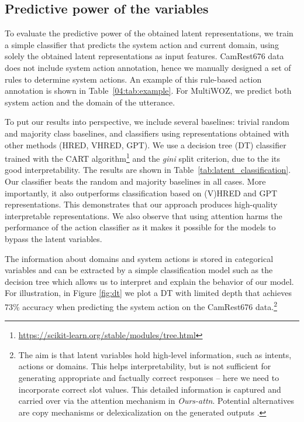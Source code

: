 \subsection{Predictive power of the variables}
\label{sec:pred_latents}
To evaluate the predictive power of the obtained latent representations, we train a simple classifier that predicts the system action and current domain, using solely the obtained latent representations as input features.
CamRest676 data does not include system action annotation, hence we manually designed a set of rules to determine system actions.
An example of this rule-based action annotation is shown in Table~\ref{04:tab:example}.
For MultiWOZ, we predict both system action and the domain of the utterance.

To put our results into perspective, we include several baselines: trivial random and majority class baselines, and classifiers using representations obtained with other methods (HRED, VHRED, GPT).
We use a decision tree (DT) classifier trained with the CART algorithm\footnote{\url{https://scikit-learn.org/stable/modules/tree.html}} and the \emph{gini} split criterion, due to the its good interpretability.
The results are shown in Table~\ref{tab:latent_classification}.
Our classifier beats the random and majority baselines in all cases.
More importantly, it also outperforms classification based on (V)HRED and GPT representations.
This demonstrates that our approach produces high-quality interpretable representations.
We also observe that using attention harms the performance of the action classifier as it makes it possible for the models to bypass the latent variables.

The information about domains and system actions is stored in categorical variables and can be extracted by a simple classification model such as the decision tree which allows us to interpret and explain the behavior of our model.
For illustration, in Figure \ref{fig:dt} we plot a DT with limited depth that achieves 73\% accuracy when predicting the system action on the CamRest676 data.\footnote{The aim is that latent variables hold high-level information, such as intents, actions or domains. This helps interpretability, but is not sufficient for generating appropriate and factually correct responses -- here we need to incorporate correct slot values. This detailed information is captured and carried over via the attention mechanism in \emph{Ours-attn}. Potential alternatives are copy mechanisms \cite{lei2018} or delexicalization on the generated outputs \cite{henderson_robust_2014,peng2021soloist}.}

